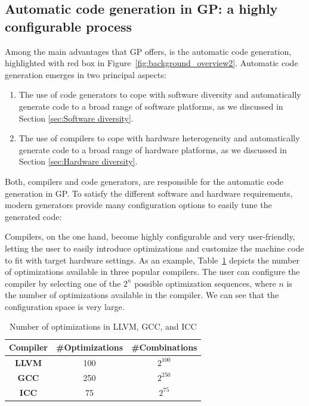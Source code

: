\subsection{Automatic code generation in GP: a highly configurable process}
Among the main advantages that GP offers, is the automatic code generation, highlighted with red box in Figure~\ref{fig:background_overview2}. Automatic code generation emerges in two principal aspects: 
\begin{enumerate}
	\item The use of code generators to cope with software diversity and automatically generate code to a broad range of software platforms, as we discussed in Section \ref{sec:Software diversity}.
	\item The use of compilers to cope with hardware heterogeneity and automatically generate code to a broad range of hardware platforms, as we discussed in Section \ref{sec:Hardware diversity}.
\end{enumerate}

Both, compilers and code generators, are responsible for the automatic code generation in GP. To satisfy the different software and hardware requirements, modern generators provide many configuration options to easily tune the generated code: 

Compilers, on the one hand, become highly configurable and very user-friendly, letting the user to easily introduce optimizations and customize the machine code to fit with target hardware settings.
As an example, Table~\ref{iccgccllvm} depicts the number of optimizations available in three popular compilers. The user can configure the compiler by selecting one of the $2^{n}$ possible optimization sequences, where $n$ is the number of optimizations available in the compiler. We can see that the configuration space is very large. 

\begin{table}[h]
	\centering
	\caption{Number of optimizations in LLVM, GCC, and ICC}
	\label{my-label}
	\begin{tabular}{|c|c|c|}
		\hline
		\textbf{Compiler} & \textbf{\#Optimizations} & \textbf{\#Combinations} \\ \hline
		\textbf{LLVM}     & 100    & $2^{100}$                                 \\ \hline
		\textbf{GCC}      & 250    & $2^{250}$                                 \\ \hline
		\textbf{ICC}      & 75     & $2^{75}$                                 \\ \hline
	\end{tabular}
	\label{iccgccllvm}
\end{table}

